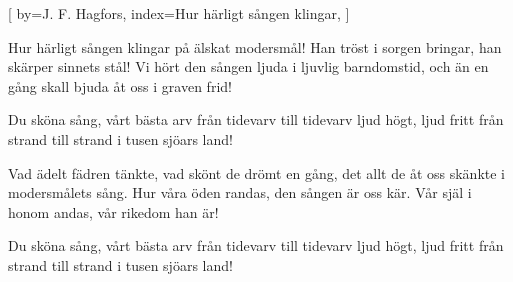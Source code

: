 

[
by={J. F. Hagfors},
index={Hur härligt sången klingar},
]

\beginverse*
Hur härligt sången klingar på älskat modersmål!
Han tröst i sorgen bringar, han skärper sinnets stål!
Vi hört den sången ljuda i ljuvlig barndomstid,
och än en gång skall bjuda åt oss i graven frid!
\endverse

\beginchorus
Du sköna sång, vårt bästa arv 
från tidevarv till tidevarv
ljud högt, ljud fritt 
från strand till strand
i tusen sjöars land!
\endchorus

\beginverse*
Vad ädelt fädren tänkte, vad skönt de drömt en gång,
det allt de åt oss skänkte i modersmålets sång.
Hur våra öden randas, den sången är oss kär.
Vår själ i honom andas, vår rikedom han är!
\endverse

\beginchorus
Du sköna sång, vårt bästa arv 
från tidevarv till tidevarv
ljud högt, ljud fritt 
från strand till strand
i tusen sjöars land!
\endchorus
\endsong


